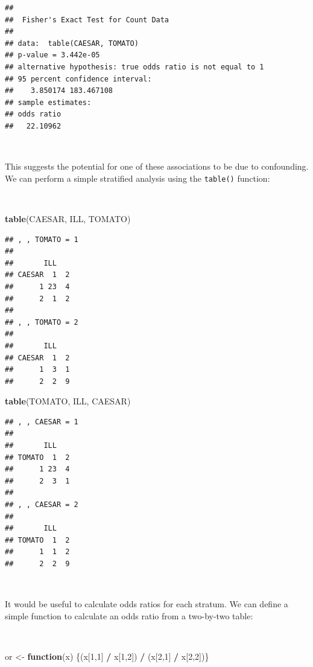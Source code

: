 \documentclass[12pt,a4paper]{book}
\newenvironment{Shaded}{\begin{snugshade}}{\end{snugshade}}
\newcommand{\ControlFlowTok}[1]{\textcolor[rgb]{0.13,0.29,0.53}{\textbf{#1}}}
\newcommand{\DecValTok}[1]{\textcolor[rgb]{0.00,0.00,0.81}{#1}}
\newcommand{\KeywordTok}[1]{\textcolor[rgb]{0.13,0.29,0.53}{\textbf{#1}}}
\newcommand{\NormalTok}[1]{#1}
\newcommand{\OperatorTok}[1]{\textcolor[rgb]{0.81,0.36,0.00}{\textbf{#1}}}
\newcommand{\StringTok}[1]{\textcolor[rgb]{0.31,0.60,0.02}{#1}}
\theoremstyle{definition}
\theoremstyle{definition}
\theoremstyle{definition}
\theoremstyle{remark}
\begin{document}
\begin{verbatim}
## 
##  Fisher's Exact Test for Count Data
## 
## data:  table(CAESAR, TOMATO)
## p-value = 3.442e-05
## alternative hypothesis: true odds ratio is not equal to 1
## 95 percent confidence interval:
##    3.850174 183.467108
## sample estimates:
## odds ratio 
##   22.10962
\end{verbatim}

~

This suggests the potential for one of these associations to be due to
confounding. We can perform a simple stratified analysis using the
\texttt{table()} function:

~

\begin{Shaded}
\begin{Highlighting}[]
\KeywordTok{table}\NormalTok{(CAESAR, ILL, TOMATO)}
\end{Highlighting}
\end{Shaded}

\begin{verbatim}
## , , TOMATO = 1
## 
##       ILL
## CAESAR  1  2
##      1 23  4
##      2  1  2
## 
## , , TOMATO = 2
## 
##       ILL
## CAESAR  1  2
##      1  3  1
##      2  2  9
\end{verbatim}

\newpage

\begin{Shaded}
\begin{Highlighting}[]
\KeywordTok{table}\NormalTok{(TOMATO, ILL, CAESAR)}
\end{Highlighting}
\end{Shaded}

\begin{verbatim}
## , , CAESAR = 1
## 
##       ILL
## TOMATO  1  2
##      1 23  4
##      2  3  1
## 
## , , CAESAR = 2
## 
##       ILL
## TOMATO  1  2
##      1  1  2
##      2  2  9
\end{verbatim}

~

It would be useful to calculate odds ratios for each stratum. We can
define a simple function to calculate an odds ratio from a two-by-two
table:

~

\begin{Shaded}
\begin{Highlighting}[]
\NormalTok{or <-}\StringTok{ }\ControlFlowTok{function}\NormalTok{(x) \{(x[}\DecValTok{1}\NormalTok{,}\DecValTok{1}\NormalTok{] }\OperatorTok{/}\StringTok{ }\NormalTok{x[}\DecValTok{1}\NormalTok{,}\DecValTok{2}\NormalTok{]) }\OperatorTok{/}\StringTok{ }\NormalTok{(x[}\DecValTok{2}\NormalTok{,}\DecValTok{1}\NormalTok{] }\OperatorTok{/}\StringTok{ }\NormalTok{x[}\DecValTok{2}\NormalTok{,}\DecValTok{2}\NormalTok{])\}}
\end{Highlighting}
\end{Shaded}
\end{document}

